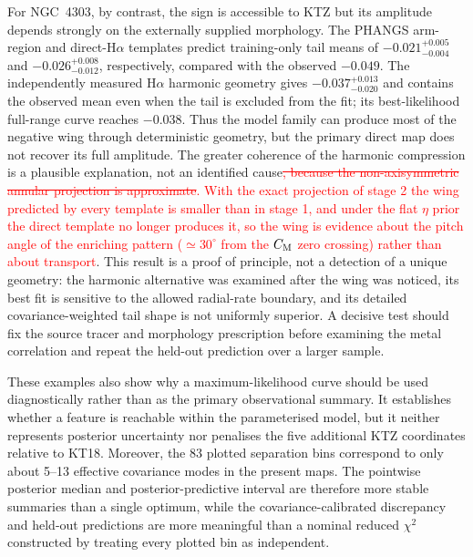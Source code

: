 \documentclass[fleqn,usenatbib]{mnras}
\newcommand{\revadd}[1]{\textcolor{red}{#1}}
\newcommand{\revdel}[1]{\textcolor{red}{\sout{#1}}\hspace{0.18em}}
\begin{document}
For NGC~4303, by contrast, the sign is accessible to KTZ but its amplitude depends strongly on the externally supplied morphology.  The PHANGS arm-region and direct-H$\alpha$ templates predict training-only tail means of $-0.021^{+0.005}_{-0.004}$ and $-0.026^{+0.008}_{-0.012}$, respectively, compared with the observed $-0.049$.  The independently measured H$\alpha$ harmonic geometry gives $-0.037^{+0.013}_{-0.020}$ and contains the observed mean even when the tail is excluded from the fit; its best-likelihood full-range curve reaches $-0.038$.  Thus the model family can produce most of the negative wing through deterministic geometry, but the primary direct map does not recover its full amplitude.  The greater coherence of the harmonic compression is a plausible explanation, not an identified cause\revdel{, because the non-axisymmetric annular projection is approximate}\revadd{.  With the exact projection of stage 2 the wing predicted by every template is smaller than in stage 1, and under the flat $\eta$ prior the direct template no longer produces it, so the wing is evidence about the pitch angle of the enriching pattern ($\simeq30^\circ$ from the $C_{\rm M}$ zero crossing) rather than about transport}.  This result is a proof of principle, not a detection of a unique geometry: the harmonic alternative was examined after the wing was noticed, its best fit is sensitive to the allowed radial-rate boundary, and its detailed covariance-weighted tail shape is not uniformly superior.  A decisive test should fix the source tracer and morphology prescription before examining the metal correlation and repeat the held-out prediction over a larger sample.

These examples also show why a maximum-likelihood curve should be used diagnostically rather than as the primary observational summary.  It establishes whether a feature is reachable within the parameterised model, but it neither represents posterior uncertainty nor penalises the five additional KTZ coordinates relative to KT18.  Moreover, the 83 plotted separation bins correspond to only about 5--13 effective covariance modes in the present maps.  The pointwise posterior median and posterior-predictive interval are therefore more stable summaries than a single optimum, while the covariance-calibrated discrepancy and held-out predictions are more meaningful than a nominal reduced $\chi^2$ constructed by treating every plotted bin as independent.
\end{document}
